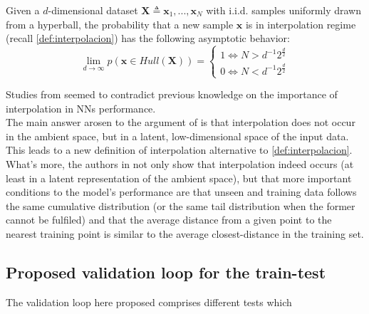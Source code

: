 \begin{theorem}\cite{barany1988shape}
	Given a $d$-dimensional dataset $\mathbf X \triangleq {\mathbf{x}_1,...,\mathbf{x}_N}$ with i.i.d. samples uniformly drawn from a hyperball, the probability that a new sample $\mathbf{x}$ is in interpolation regime (recall \autoref{def:interpolacion}) has the following asymptotic behavior:\\
	
	\begin{equation}
		\lim_{d \to \infty}p(\mathbf{x}\in Hull(\mathbf{X}))=
		\begin{cases}
			1 \iff N>d^{-1}2^{\frac{d}{2}}\\
			0 \iff N<d^{-1}2^{\frac{d}{2}}
		\end{cases}	
	\end{equation}
\end{theorem}
	
\indent Studies from \cite{balestriero2021learning} seemed to contradict previous knowledge on the importance of interpolation in NNs performance.\\
%
\indent The main answer arosen to the argument of \cite{balestriero2021learning} is that interpolation does not occur in the ambient space, but in a latent, low-dimensional space of the input data\cite{bonnasse2022interpolation}. This leads to a new definition of interpolation alternative to \autoref{def:interpolacion}.\\
%
\indent What's more, the authors in \cite{bonnasse2022interpolation} not only show that interpolation indeed occurs (at least in a latent representation of the ambient space), but that more important conditions to the model's performance are that unseen and training data follows the same cumulative distribution (or the same tail distribution when the former cannot be fulfiled) and that the average distance from a given point to the nearest training point is similar to the average closest-distance in the training set.\\
%
\subsection{Proposed validation loop for the train-test}
\indent The validation loop here proposed comprises different tests which 
%




